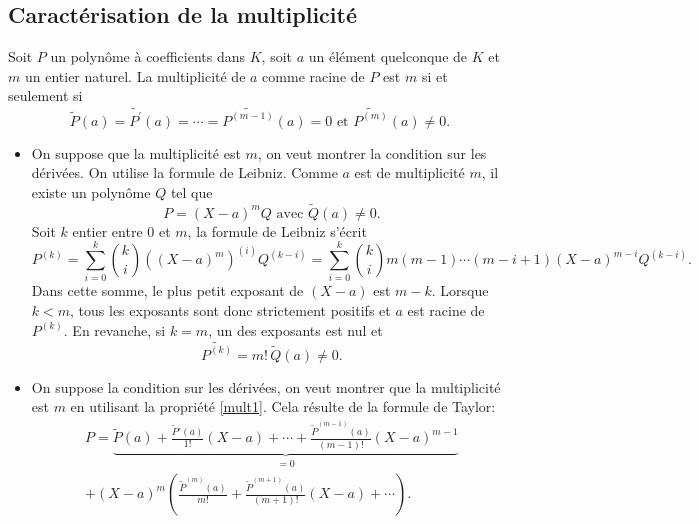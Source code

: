 \subsection{Caractérisation de la multiplicité}
\begin{thm}
Soit $P$ un polynôme à coefficients dans $K$, soit $a$ un élément quelconque de $K$ et $m$ un entier naturel. La multiplicité de $a$ comme racine de $P$ est $m$ si et seulement si
\begin{displaymath}
\widetilde{P}(a)=\widetilde{P^\prime}(a)= \cdots =\widetilde{P^{(m-1)}}(a)=0 \text{ et } \widetilde{P^{(m)}}(a)\neq 0.
\end{displaymath}
\end{thm}
\begin{demo}
 \begin{itemize}
  \item On suppose que la multiplicité est $m$, on veut montrer la condition sur les dérivées. On utilise la formule de Leibniz.\newline
Comme $a$ est de multiplicité $m$, il existe un polynôme $Q$ tel que
\begin{displaymath}
 P=(X-a)^m Q \text{ avec }\widetilde{Q}(a)\neq 0.
\end{displaymath}
Soit $k$ entier entre $0$ et $m$, la formule de Leibniz s'écrit
\begin{displaymath}
 P^{(k)}= \sum_{i=0}^{k}\binom{k}{i}\left((X-a)^m \right)^{(i)}Q^{(k-i)} 
= \sum_{i=0}^{k}\binom{k}{i}m(m-1)\cdots(m-i+1)(X-a)^{m-i}Q^{(k-i)}.
\end{displaymath}
Dans cette somme, le plus petit exposant de $(X-a)$ est $m-k$. Lorsque $k<m$, tous les exposants sont donc strictement positifs et $a$ est racine de $P^{(k)}$. En revanche, si $k=m$, un des exposants est nul et
\begin{displaymath}
 \widetilde{P^{(k)}} = m!\,\widetilde{Q}(a)\neq 0.
\end{displaymath}

\item On suppose la condition sur les dérivées, on veut montrer que la multiplicité est $m$ en utilisant la propriété \ref{mult1}. Cela résulte de la formule de Taylor:
\begin{multline*}
 P= 
\underset{ = 0 }{\underbrace{\widetilde{P}(a) + \frac{\widetilde{P}'(a)}{1!}(X-a) + \cdots + \frac{\widetilde{P}^{(m-1)}(a)}{(m-1)!}(X-a)^{m-1}}} \\
+ 
(X-a)^m\left( \frac{\widetilde{P}^{(m)}(a)}{m!} + \frac{\widetilde{P}^{(m+1)}(a)}{(m+1)!}(X-a) + \cdots
\right)  .
\end{multline*}
 \end{itemize}
\end{demo}

